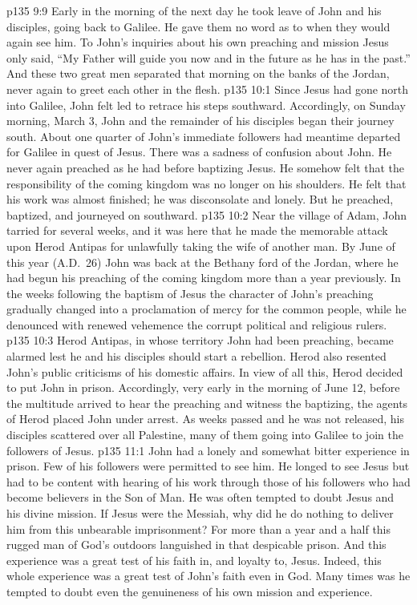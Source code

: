 \pc \vs p135 9:9 Early in the morning of the next day he took leave of John and his disciples, going back to Galilee. He gave them no word as to when they would again see him. To John’s inquiries about his own preaching and mission Jesus only said, \textcolor{ubdarkred}{“My Father will guide you now and in the future as he has in the past.”} And these two great men separated that morning on the banks of the Jordan, never again to greet each other in the flesh.
\vs p135 10:1 Since Jesus had gone north into Galilee, John felt led to retrace his steps southward. Accordingly, on Sunday morning, March 3, John and the remainder of his disciples began their journey south. About one quarter of John’s immediate followers had meantime departed for Galilee in quest of Jesus. There was a sadness of confusion about John. He never again preached as he had before baptizing Jesus. He somehow felt that the responsibility of the coming kingdom was no longer on his shoulders. He felt that his work was almost finished; he was disconsolate and lonely. But he preached, baptized, and journeyed on southward.
\vs p135 10:2 Near the village of Adam, John tarried for several weeks, and it was here that he made the memorable attack upon Herod Antipas for unlawfully taking the wife of another man. By June of this year (A.D.~26) John was back at the Bethany ford of the Jordan, where he had begun his preaching of the coming kingdom more than a year previously. In the weeks following the baptism of Jesus the character of John’s preaching gradually changed into a proclamation of mercy for the common people, while he denounced with renewed vehemence the corrupt political and religious rulers.\plusone
\vs p135 10:3 Herod Antipas, in whose territory John had been preaching, became alarmed lest he and his disciples should start a rebellion. Herod also resented John’s public criticisms of his domestic affairs. In view of all this, Herod decided to put John in prison. Accordingly, very early in the morning of June 12, before the multitude arrived to hear the preaching and witness the baptizing, the agents of Herod placed John under arrest. As weeks passed and he was not released, his disciples scattered over all Palestine, many of them going into Galilee to join the followers of Jesus.
\vs p135 11:1 John had a lonely and somewhat bitter experience in prison. Few of his followers were permitted to see him. He longed to see Jesus but had to be content with hearing of his work through those of his followers who had become believers in the Son of Man. He was often tempted to doubt Jesus and his divine mission. If Jesus were the Messiah, why did he do nothing to deliver him from this unbearable imprisonment? For more than a year and a half this rugged man of God’s outdoors languished in that despicable prison. And this experience was a great test of his faith in, and loyalty to, Jesus. Indeed, this whole experience was a great test of John’s faith even in God. Many times was he tempted to doubt even the genuineness of his own mission and experience.
